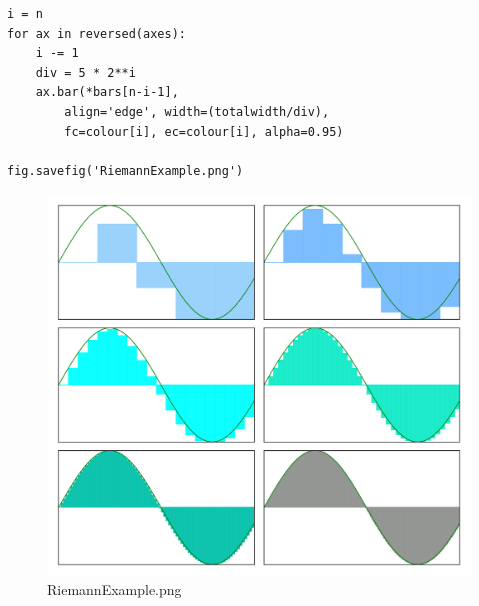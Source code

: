 \begin{verbatim}
i = n
for ax in reversed(axes):
    i -= 1
    div = 5 * 2**i
    ax.bar(*bars[n-i-1], 
        align='edge', width=(totalwidth/div), 
        fc=colour[i], ec=colour[i], alpha=0.95)

fig.savefig('RiemannExample.png')
\end{verbatim}

\begin{figure}[H]
\centering
\includegraphics{Code/RiemannExample.png}
\caption{RiemannExample.png}
\end{figure}